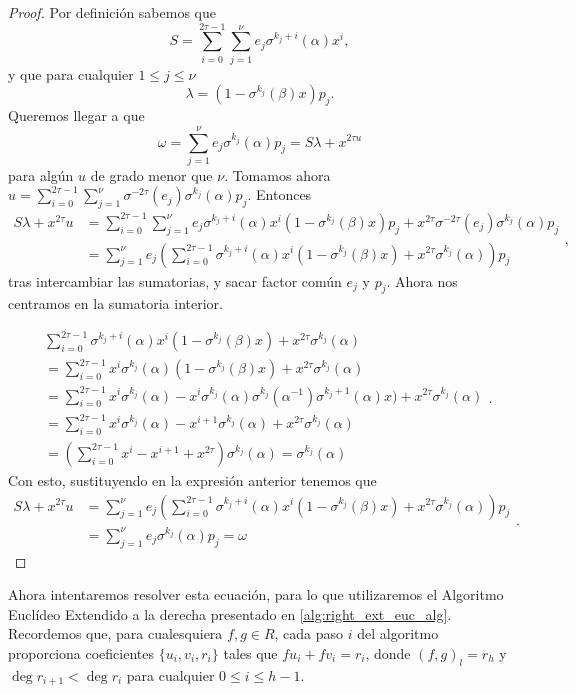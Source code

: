 \begin{proof}
Por definición sabemos que
\[
S = \sum_{i = 0}^{2\tau-1} \sum_{j=1}^{\nu} e_j \sigma^{k_j + i}(\alpha) x^i
,\]
y que para cualquier \(1 \leq j \leq \nu\)
\[
\lambda = (1 - \sigma^{k_j}(\beta)x)p_j
.\]
Queremos llegar a que
\[
\omega = \sum_{j=1}^{\nu} e_j \sigma^{k_j}(\alpha)p_j = S\lambda + x^{2\tau u}
\]
para algún \(u\) de grado menor que \(\nu\). Tomamos ahora \(u = \sum_{i = 0}^{2\tau-1} \sum_{j=1}^{\nu} \sigma^{-2\tau}(e_j)\sigma^{k_j}(\alpha)p_j\). Entonces
\[
\begin{aligned}
S\lambda + x^{2\tau} u &= \sum_{i = 0}^{2\tau-1} \sum_{j=1}^{\nu} e_j\sigma^{k_j + i}(\alpha)x^i(1-\sigma^{k_j}(\beta)x)p_j + x^{2\tau}\sigma^{-2\tau}(e_j)\sigma^{k_j}(\alpha)p_j \\
&= \sum_{j=1}^{\nu} e_j \left( \sum_{i = 0}^{2\tau-1} \sigma^{k_j + i}(\alpha)x^i(1-\sigma^{k_j}(\beta)x) + x^{2\tau}\sigma^{k_j}(\alpha)\right)p_j
\end{aligned}
,\]
tras intercambiar las sumatorias, y sacar factor común \(e_j\) y \(p_j\). Ahora nos centramos en la sumatoria interior.

\[
\begin{aligned}
&\sum_{i = 0}^{2\tau-1} \sigma^{k_j + i}(\alpha)x^i(1-\sigma^{k_j}(\beta)x) + x^{2\tau}\sigma^{k_j}(\alpha) \\
&= \sum_{i = 0}^{2\tau-1} x^i \sigma^{k_j}(\alpha) (1-\sigma^{k_j}(\beta)x) + x^{2\tau}\sigma^{k_j}(\alpha) \\
&= \sum_{i = 0}^{2\tau-1} x^i \sigma^{k_j}(\alpha) - x^i \sigma^{k_j}(\alpha)\sigma^{k_j}(\alpha^{-1})\sigma^{k_j + 1}(\alpha) x) + x^{2\tau}\sigma^{k_j}(\alpha)\\
&=\sum_{i = 0}^{2\tau-1} x^i \sigma^{k_j}(\alpha) - x^{i+1} \sigma^{k_j}(\alpha) + x^{2\tau}\sigma^{k_j}(\alpha)\\
&=\left(\sum_{i = 0}^{2\tau-1} x^i  - x^{i+1} + x^{2\tau}\right)\sigma^{k_j}(\alpha) = \sigma^{k_j}(\alpha)
\end{aligned}
.\]
Con esto, sustituyendo en la expresión anterior tenemos que
\[
\begin{aligned}
S\lambda + x^{2\tau} u &= \sum_{j=1}^{\nu} e_j \left( \sum_{i = 0}^{2\tau-1} \sigma^{k_j + i}(\alpha)x^i(1-\sigma^{k_j}(\beta)x) + x^{2\tau}\sigma^{k_j}(\alpha)\right)p_j \\
&= \sum_{j=1}^{\nu} e_j \sigma^{k_j}(\alpha) p_j = \omega
\end{aligned}
.\]
\end{proof}

Ahora intentaremos resolver esta ecuación, para lo que utilizaremos el Algoritmo Euclídeo Extendido a la derecha presentado en \ref{alg:right_ext_euc_alg}. Recordemos que, para cualesquiera \(f,g \in R\), cada paso \(i\) del algoritmo proporciona coeficientes \(\{u_{i}, v_{i}, r_{i}\}\) tales que \(fu_{i} + fv_{i} = r_{i}\), donde \({(f,g)}_l = r_h\) y \(\deg r_{i+1} < \deg r_{i}\) para cualquier \(0 \le i \le h-1\).

